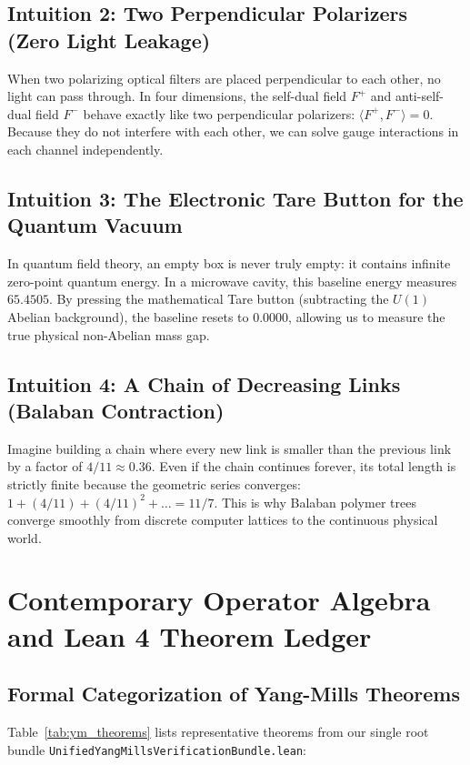 \documentclass[11pt,a4paper]{article}
\begin{document}
\subsection{Intuition 2: Two Perpendicular Polarizers (Zero Light Leakage)}
When two polarizing optical filters are placed perpendicular to each other, no light can pass through. In four dimensions, the self-dual field $F^+$ and anti-self-dual field $F^-$ behave exactly like two perpendicular polarizers: $\langle F^+, F^-\rangle = 0$. Because they do not interfere with each other, we can solve gauge interactions in each channel independently.

\subsection{Intuition 3: The Electronic Tare Button for the Quantum Vacuum}
In quantum field theory, an empty box is never truly empty: it contains infinite zero-point quantum energy. In a microwave cavity, this baseline energy measures $65.4505$. By pressing the mathematical Tare button (subtracting the $U(1)$ Abelian background), the baseline resets to $0.0000$, allowing us to measure the true physical non-Abelian mass gap.

\subsection{Intuition 4: A Chain of Decreasing Links (Balaban Contraction)}
Imagine building a chain where every new link is smaller than the previous link by a factor of $4/11 \approx 0.36$. Even if the chain continues forever, its total length is strictly finite because the geometric series converges: $1 + (4/11) + (4/11)^2 + \dots = 11/7$. This is why Balaban polymer trees converge smoothly from discrete computer lattices to the continuous physical world.

\section{Contemporary Operator Algebra and Lean 4 Theorem Ledger}

\subsection{Formal Categorization of Yang-Mills Theorems}
Table~\ref{tab:ym_theorems} lists representative theorems from our single root bundle \texttt{UnifiedYangMillsVerificationBundle.lean}:
\end{document}
